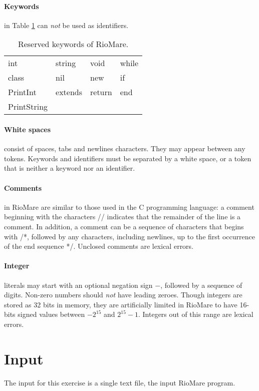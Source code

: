 \documentclass{article}
\begin{document}
\paragraph{Keywords} in Table \ref{Table_Reserved_Keywords_of_RioMare} can \textit{not}
be used as identifiers.
\begin{table}[h]
\centering
\begin{tabular}{ l l l l}
  int         & string  & void   & while \\
  class       & nil     & new    & if    \\
  PrintInt    & extends & return & end   \\
  PrintString &         &        &       \\
\end{tabular}
\caption{
Reserved keywords of RioMare.
\label{Table_Reserved_Keywords_of_RioMare}}
\end{table}
\paragraph{White spaces} consist of spaces, tabs and newlines
characters. They may appear between any tokens.
Keywords and identifiers must be separated by a white space,
or a token that is neither a keyword nor an identifier.
\paragraph{Comments} in RioMare are similar to those used in the C programming language:
a comment beginning with the characters // indicates that the remainder of the line is a comment.
In addition, a comment can be a sequence of characters that begins with /*,
followed by any characters, including newlines, up to the first occurrence of the end sequence */. Unclosed comments are lexical errors.
\paragraph{Integer} literals may start with an optional negation sign $-$,
followed by a sequence of digits.
Non-zero numbers should \textit{not} have leading zeroes.
Though integers are stored as 32 bits in memory,
they are artificially limited in RioMare to have
16-bits signed values between $-2^{15}$ and $2^{15}-1$.
Integers out of this range are lexical errors.

\section{Input}
The input for this exercise is a single text file, the input RioMare program.
\end{document}
